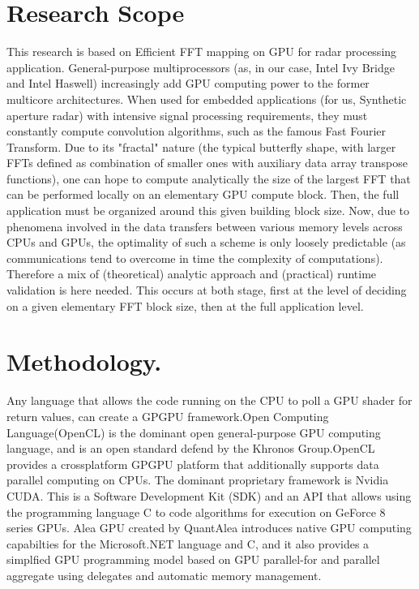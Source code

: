 \documentclass{report}
\begin{document}
\section{Research Scope}
This research is based on Efficient FFT mapping on GPU for radar processing application. General-purpose multiprocessors (as, in our case, Intel Ivy Bridge and Intel Haswell) increasingly add GPU computing power to the former multicore architectures. When used for embedded applications (for us, Synthetic aperture radar) with intensive signal processing requirements, they must constantly compute convolution algorithms, such as the famous Fast Fourier Transform. Due to its "fractal" nature (the typical butterfly shape, with larger FFTs defined as combination of smaller ones with auxiliary data array transpose functions), one can hope to compute analytically the size of the largest FFT that can be performed locally on an elementary GPU compute block. Then, the full application must be organized around this given building block size. Now, due to phenomena involved in the data transfers between various memory levels across CPUs and GPUs, the optimality of such a scheme is only loosely predictable (as communications tend to overcome in time the complexity of computations). Therefore a mix of (theoretical) analytic approach and (practical) runtime validation is here needed. This occurs at both stage, first at the level of deciding on a given elementary FFT block size, then at the full application level.
\section{Methodology.}
Any language that allows the code running on the CPU to poll a GPU shader for return values, can create a GPGPU framework.Open Computing Language(OpenCL) is the dominant open general-purpose GPU computing language, and is an open standard defend by the Khronos Group.OpenCL provides a crossplatform GPGPU platform that additionally supports data parallel computing
on CPUs.
The dominant proprietary framework is Nvidia CUDA. This is a Software Development Kit (SDK) and an API that allows using the programming language C to code algorithms for execution on GeForce 8 series GPUs. Alea GPU created by QuantAlea introduces native GPU computing capabilties for the Microsoft.NET language and C, and it also provides a simplfied GPU programming model based on GPU parallel-for and parallel aggregate using delegates and automatic memory management.
\end{document}
